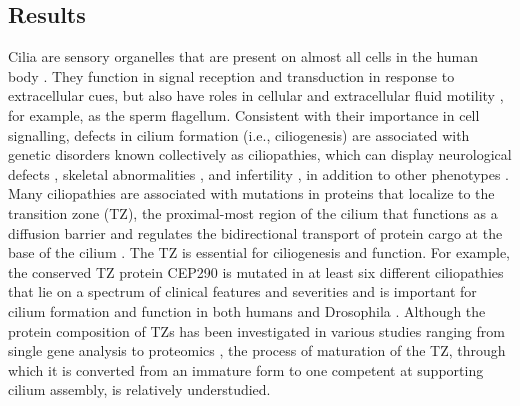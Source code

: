 \documentclass[12pt, twoside, letterpaper]{article}
\begin{document}
\begin{doublespacing}
\begin{linenumbers}
    \section*{Results}
    Cilia are sensory organelles that are present on almost all cells in the human body
    \citep{satir2010primary, marshall2006cilia}.
    They function in signal reception and transduction in response to extracellular cues,
    but also have roles in cellular and extracellular fluid motility
    \citep{marshall2006cilia, eley2005cilia, brooks2014multiciliated},
    for example, as the sperm flagellum.
    Consistent with their importance in cell signalling,
    defects in cilium formation (i.e., ciliogenesis) are associated with genetic disorders
    known collectively as ciliopathies, which can display
    neurological defects \citep{valente2014primary},
    skeletal abnormalities \citep{hammarsjo2017novel},
    and infertility \citep{inaba2016sperm}, in addition to other phenotypes
    \citep{waters2011ciliopathies}.
    Many ciliopathies are associated with mutations in proteins that localize
    to the transition zone (TZ), the proximal-most region of the cilium that
    functions as a diffusion barrier and regulates the
    bidirectional transport of protein cargo at the base of the cilium
    \citep{reiter2012base, szymanska2012transition}.
    The TZ is essential for ciliogenesis and function.
    For example, the conserved TZ protein CEP290 is mutated in at least
    six different ciliopathies
    \citep{rachel2012photoreceptor} that lie on a spectrum of clinical features and severities
    and is important for cilium formation
    and function in both humans \citep{shimada2017vitro, stowe2012centriolar}
    and Drosophila \citep{basiri2014migrating}.
    Although the protein composition of TZs has been investigated in various
    studies ranging from single gene analysis to proteomics \citep{gonccalves2017ciliary},
    the process of maturation of the TZ, through which it is converted from an
    immature form to one competent at supporting
    cilium assembly, is relatively understudied.


\end{linenumbers}
\end{doublespacing}
\end{document}
